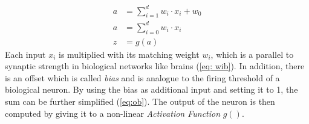 \begin{align}
	a &= \sum_{i=1}^{d} w_i \cdot x_i + w_0 \label{eq: wib}\\
	a &= \sum_{i=0}^{d} w_i \cdot x_i \label{eq:ob}\\
	z &= g(a) \label{active}
\end{align}
\newline
Each input $x_i$ is multiplied with its matching weight $w_i$, 
which is a parallel to synaptic strength in biological networks like brains (\cref{eq: wib}). 
In addition, there is an offset which is called \emph{bias} and is analogue to the firing threshold of a biological neuron. 
By using the bias as additional input and setting it to 1, the sum can be further simplified (\cref{eq:ob}). 
The output of the neuron is then computed by giving it to a non-linear \emph{Activation Function} $g()$.

\newpage

